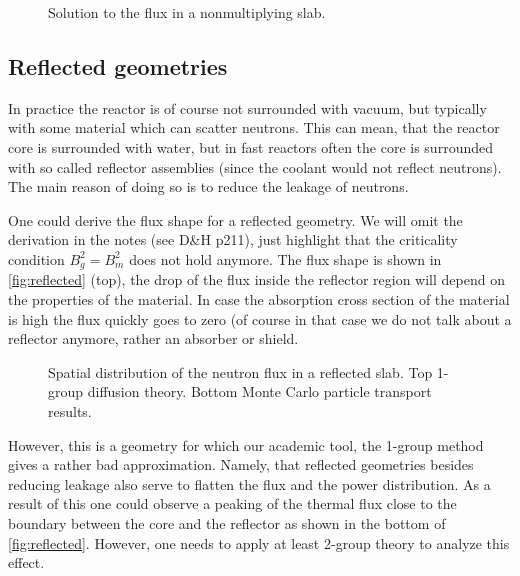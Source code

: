 \begin{figure}[ht!]
\protect {}\protect
\caption{\label{fig:nonmultislab} \footnotesize{Solution to the flux in a nonmultiplying slab.}}
\end{figure} 

\subsection{Reflected geometries}

In practice the reactor is of course not surrounded with vacuum, but typically with some material which can scatter neutrons. This can mean, that the reactor core is surrounded with water, but in fast reactors often the core is surrounded with so called reflector assemblies (since the coolant would not reflect neutrons). The main reason of doing so is to reduce the leakage of neutrons.

One could derive the flux shape for a reflected geometry. We will omit the derivation in the notes (see D\&H p211), just highlight that the criticality condition $B_g^2=B_m^2$ does not hold anymore. The flux shape is shown in \autoref{fig:reflected} (top), the drop of the flux inside the reflector region will depend on the properties of the material. In case the absorption cross section of the material is high the flux quickly goes to zero (of course in that case we do not talk about a reflector anymore, rather an absorber or shield. 

\begin{figure}[ht!]
\protect {}\protect
\caption{\label{fig:reflected} \footnotesize{Spatial distribution of the neutron flux in a reflected slab. Top 1-group diffusion theory. Bottom Monte Carlo particle transport results.}}
\end{figure} 

However, this is a geometry for which our academic tool, the 1-group method gives a rather bad approximation. Namely, that reflected geometries besides reducing leakage also serve to flatten the flux and the power distribution. As a result of this one could observe a peaking of the thermal flux close to the boundary between the core and the reflector as shown in the bottom of \autoref{fig:reflected}. However, one needs to apply at least 2-group theory to analyze this effect.

